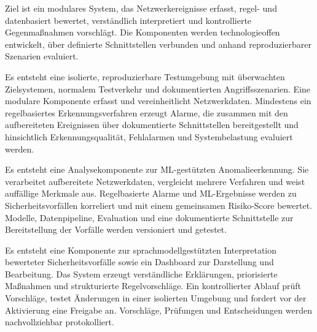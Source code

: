 
Ziel ist ein modulares System, das Netzwerkereignisse erfasst, regel- und datenbasiert bewertet, verständlich interpretiert und kontrollierte Gegenmaßnahmen vorschlägt. Die Komponenten werden technologieoffen entwickelt, über definierte Schnittstellen verbunden und anhand reproduzierbarer Szenarien evaluiert.

Es entsteht eine isolierte, reproduzierbare Testumgebung mit überwachten Zielsystemen, normalem Testverkehr und dokumentierten Angriffsszenarien. Eine modulare Komponente erfasst und vereinheitlicht Netzwerkdaten. Mindestens ein regelbasiertes Erkennungsverfahren erzeugt Alarme, die zusammen mit den aufbereiteten Ereignissen über dokumentierte Schnittstellen bereitgestellt und hinsichtlich Erkennungsqualität, Fehlalarmen und Systembelastung evaluiert werden.

Es entsteht eine Analysekomponente zur ML-gestützten Anomalieerkennung. Sie verarbeitet aufbereitete Netzwerkdaten, vergleicht mehrere Verfahren und weist auffällige Merkmale aus. Regelbasierte Alarme und ML-Ergebnisse werden zu Sicherheitsvorfällen korreliert und mit einem gemeinsamen Risiko-Score bewertet. Modelle, Datenpipeline, Evaluation und eine dokumentierte Schnittstelle zur Bereitstellung der Vorfälle werden versioniert und getestet.

Es entsteht eine Komponente zur sprachmodellgestützten Interpretation bewerteter Sicherheitsvorfälle sowie ein Dashboard zur Darstellung und Bearbeitung. Das System erzeugt verständliche Erklärungen, priorisierte Maßnahmen und strukturierte Regelvorschläge. Ein kontrollierter Ablauf prüft Vorschläge, testet Änderungen in einer isolierten Umgebung und fordert vor der Aktivierung eine Freigabe an. Vorschläge, Prüfungen und Entscheidungen werden nachvollziehbar protokolliert.


